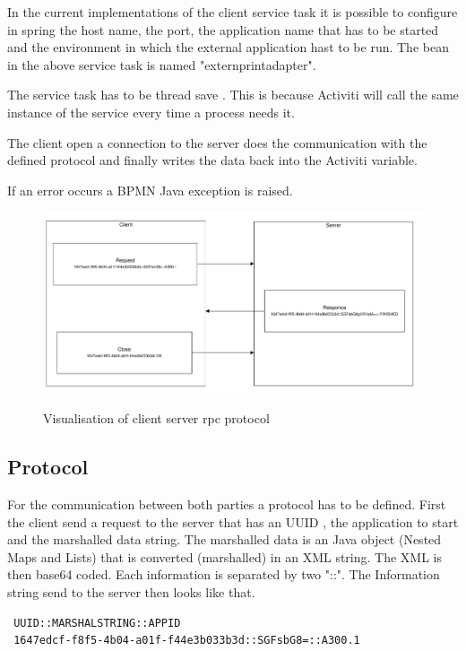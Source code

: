 \documentclass[paper=a4,twoside=false,BCOR=0mm,DIV=calc,fontsize=12pt]{scrartcl}
\begin{document}
In the current implementations of the client service task it is possible to configure in spring the host name, the port, the application name that has to be started and the environment in which the external application hast to be run. The bean in the above service task is named "externprintadapter".

The service task has to be thread save \cite{treadsave}. This is because Activiti will call the same instance of the service every time a process needs it. 

The client open a connection to the server does the communication with the defined protocol and finally writes the data back into the Activiti variable.

If an error occurs a BPMN Java exception is raised.

\begin{figure}
    \begin{center}
       \includegraphics[width=1\textwidth]{./img/clientServerProtocoll.pdf}\\
    \end{center}
  \caption{Visualisation of client server rpc protocol}
  \label{protocol}
\end{figure} 

\subsection{Protocol}
For the communication between both parties a protocol has to be defined. 
First the client send a request to the server that has an UUID \cite{uuid}, the application to start and the marshalled data string. The marshalled data is an Java object (Nested Maps and Lists) that is converted (marshalled) in an XML string. The XML is then base64 \cite{base64} coded.
Each information is separated by two "::". The Information string send to the server then looks like that.
\begin{verbatim}
 UUID::MARSHALSTRING::APPID
 1647edcf-f8f5-4b04-a01f-f44e3b033b3d::SGFsbG8=::A300.1
\end{verbatim}
\end{document}

